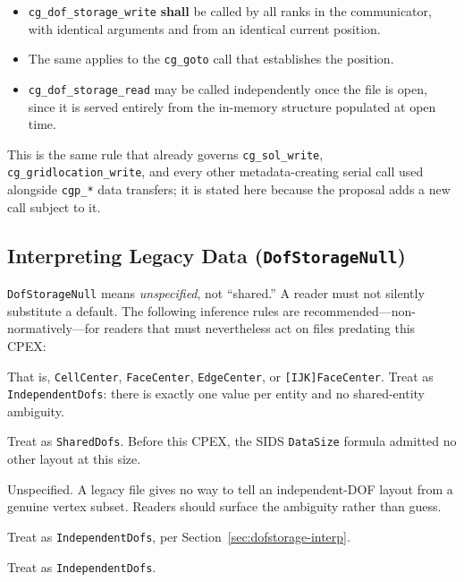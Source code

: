\documentclass[11pt,letterpaper]{article}
\begin{document}
\begin{itemize}[leftmargin=2em]
\item \texttt{cg\_dof\_storage\_write} \textbf{shall} be called by all
  ranks in the communicator, with identical arguments and from an
  identical current position.
\item The same applies to the \texttt{cg\_goto} call that establishes
  the position.
\item \texttt{cg\_dof\_storage\_read} may be called independently once
  the file is open, since it is served entirely from the in-memory
  structure populated at open time.
\end{itemize}

This is the same rule that already governs \texttt{cg\_sol\_write},
\texttt{cg\_gridlocation\_write}, and every other metadata-creating
serial call used alongside \texttt{cgp\_*} data transfers; it is stated
here because the proposal adds a new call subject to it.

\subsection{Interpreting Legacy Data (\texttt{DofStorageNull})}
\label{sec:legacy-inference}

\texttt{DofStorageNull} means \emph{unspecified}, not ``shared.''  A
reader must not silently substitute a default.  The following
inference rules are recommended---non-normatively---for readers that
must nevertheless act on files predating this CPEX:

\begin{description}[leftmargin=2em]
\item[Any element- or face-centred location] That is,
  \texttt{CellCenter}, \texttt{FaceCenter}, \texttt{EdgeCenter}, or
  \texttt{[IJK]FaceCenter}.  Treat as \texttt{IndependentDofs}: there is
  exactly one value per entity and no shared-entity ambiguity.

\item[\texttt{Vertex} with $\texttt{DataSize} = \texttt{VertexSize}$]
  Treat as \texttt{SharedDofs}.  Before this CPEX, the SIDS
  \texttt{DataSize} formula admitted no other layout at this size.

\item[\texttt{Vertex} with a \texttt{PointList}] Unspecified.  A
  legacy file gives no way to tell an independent-DOF layout from a
  genuine vertex subset.  Readers should surface the ambiguity rather
  than guess.

\item[\texttt{InterpolationPoints} (CPEX~0045)] Treat as
  \texttt{IndependentDofs}, per Section~\ref{sec:dofstorage-interp}.

\item[\texttt{IntegrationPoint} (CPEX~0047)] Treat as
  \texttt{IndependentDofs}.
\end{description}
\end{document}
